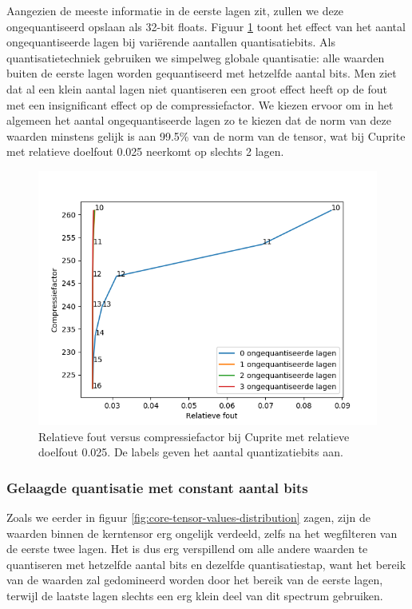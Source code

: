 \newpage
Aangezien de meeste informatie in de eerste lagen zit, zullen we deze ongequantiseerd opslaan als 32-bit floats. Figuur \ref{fig:core-tensor-unquantized-portion} toont het effect van het aantal ongequantiseerde lagen bij vari\"erende aantallen quantisatiebits. Als quantisatietechniek gebruiken we simpelweg globale quantisatie: alle waarden buiten de eerste lagen worden gequantiseerd met hetzelfde aantal bits. Men ziet dat al een klein aantal lagen niet quantiseren een groot effect heeft op de fout met een insignificant effect op de compressiefactor. We kiezen ervoor om in het algemeen het aantal ongequantiseerde lagen zo te kiezen dat de norm van deze waarden minstens gelijk is aan 99.5\% van de norm van de tensor, wat bij Cuprite met relatieve doelfout 0.025 neerkomt op slechts 2 lagen.

\begin{figure}[H]
  \centering
  \includegraphics[scale=0.7]{images/core_tensor_unquantized_portion.png}
  \caption{Relatieve fout versus compressiefactor bij Cuprite met relatieve doelfout 0.025. De labels geven het aantal quantizatiebits aan.}
\label{fig:core-tensor-unquantized-portion}
\end{figure}

\subsubsection{Gelaagde quantisatie met constant aantal bits}

Zoals we eerder in figuur \ref{fig:core-tensor-values-distribution} zagen, zijn de waarden binnen de kerntensor erg ongelijk verdeeld, zelfs na het wegfilteren van de eerste twee lagen. Het is dus erg verspillend om alle andere waarden te quantiseren met hetzelfde aantal bits en dezelfde quantisatiestap, want het bereik van de waarden zal gedomineerd worden door het bereik van de eerste lagen, terwijl de laatste lagen slechts een erg klein deel van dit spectrum gebruiken.\\

